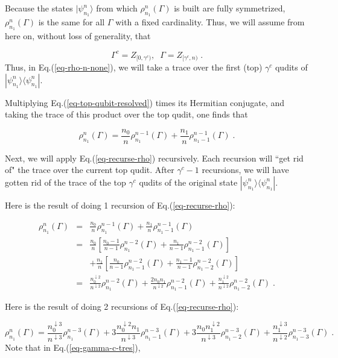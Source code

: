 \documentclass[12pt]{article}%
\newcommand{\bra}[1]{\langle#1|}
\newcommand{\ket}[1]{|#1\rangle}
\newcommand{\beq}{\begin{equation}}
\newcommand{\eeq}{\end{equation}}
\newcommand{\beqa}{\begin{eqnarray}}
\newcommand{\eeqa}{\end{eqnarray}}
\newcommand{\darrow}[0]{{\downarrow}}
\begin{document}
{Because the states
$\ket{\psi^n_{n_1}}$ from which
$\rho^n_{n_1}(\Gamma)$  is built are fully symmetrized,
$\rho^n_{n_1}(\Gamma)$ is the same for all $\Gamma$
with a fixed cardinality.
Thus,
we will assume from here on, without loss of generality, that


\beq
\Gamma^c = Z_{[0, \gamma^c)},\;\;
\Gamma = Z_{[\gamma^c, n)}
\;.
\eeq
Thus,
in Eq.(\ref{eq-rho-n-none}), we will take a
trace over the first (top) $\gamma^c$
qudits of $\ket{\psi^n_{n_1}}
\bra{\psi^n_{n_1}}$.

Multiplying Eq.(\ref{eq-top-qubit-resolved})
times its Hermitian conjugate,
and taking the trace
of this product over the top qudit,
one finds that

\beq
\rho^{n}_{n_1}(\Gamma)=
\frac{n_0}{n}\rho^{n-1}_{n_1}(\Gamma)
+
\frac{n_1}{n}\rho^{n-1}_{n_1-1}(\Gamma)
\;.
\label{eq-recurse-rho}
\eeq

Next, we will apply Eq.(\ref{eq-recurse-rho})
recursively. Each recursion will
``get rid of" the trace over the current top qudit.
After $\gamma^c-1$ recursions, we will have
gotten rid of the trace of the top
$\gamma^c$ qudits of the original
state $\ket{\psi^n_{n_1}}
\bra{\psi^n_{n_1}}$.


Here is the result of doing 1
 recursion of Eq.(\ref{eq-recurse-rho}):

\beqa
\rho^{n}_{n_1}(\Gamma)&=&
\frac{n_0}{n}\rho^{n-1}_{n_1}(\Gamma)
+
\frac{n_1}{n}\rho^{n-1}_{n_1-1}(\Gamma)
\\
&=&
\frac{n_0}{n}
\left[
\frac{n_0-1}{n-1}\rho^{n-2}_{n_1}(\Gamma)
+
\frac{n_1}{n-1}\rho^{n-2}_{n_1-1}(\Gamma)
\right]
\\
&& +
\frac{n_1}{n}
\left[
\frac{n_0}{n-1}\rho^{n-2}_{n_1-1}(\Gamma)
+
\frac{n_1-1}{n-1}\rho^{n-2}_{n_1-2}(\Gamma)
\right]
\\
&=&
\frac{n_0^{\darrow 2}}{n^{\darrow 2}}
\rho^{n-2}_{n_1}(\Gamma)
+
\frac{2n_0 n_1}{n^{\darrow 2}}
\rho^{n-2}_{n_1-1}(\Gamma)
+
\frac{n_1^{\darrow 2}}{n^{\darrow 2}}
\rho^{n-2}_{n_1-2}(\Gamma)
\;.
\eeqa

Here is the result of doing 2 recursions
of Eq.(\ref{eq-recurse-rho}):

\beq
\rho^{n}_{n_1}(\Gamma)=
\frac{n_0^{\darrow 3}}{n^{\darrow 3}}
\rho^{n-3}_{n_1}(\Gamma)
+
3\frac{n_0^{\darrow 2}n_1}{n^{\darrow 3}}
\rho^{n-3}_{n_1-1}(\Gamma)
+
3\frac{n_0 n_1^{\darrow 2}}{n^{\darrow 3}}
\rho^{n-3}_{n_1-2}(\Gamma)
+
\frac{n_1^{\darrow 3}}{n^{\darrow 2}}
\rho^{n-3}_{n_1-3}(\Gamma)
\;.
\label{eq-gamma-c-tres}
\eeq
Note that in Eq.(\ref{eq-gamma-c-tres}),

}
\end{document}
